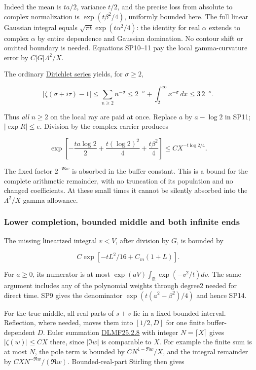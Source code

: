 Indeed the mean is \(ta/2\), variance \(t/2\), and the precise loss from absolute to complex normalization is \(\exp(t \beta^{2}/4)\), uniformly bounded here. The full linear Gaussian integral equals \(\sqrt{\pi t}\exp(t \alpha^{2}/4)\): the identity for real \(\alpha\) extends to complex \(\alpha\) by entire dependence and Gaussian domination. No contour shift or omitted boundary is needed. Equations SP10--11 pay the local gamma-curvature error by \(C |G| \Lambda^{2}/X\).

The ordinary \href{https://dlmf.nist.gov/25.2.E1}{Dirichlet series} yields, for \(\sigma\ge 2\),

\[
|\zeta(\sigma+i\tau)-1|\le\sum_{n\ge2}n^{-\sigma}
 \le 2^{-\sigma}+\int_2^\infty x^{-\sigma}\,dx
 \le3\,2^{-\sigma}.
\tag{SP12}\label{eq:ansatz-sp12}
\]

Thus \emph{all} \(n\ge 2\) on the local ray are paid at once. Replace \(a\) by \(a-\log2\) in SP11; \(|\exp R|\le e\). Division by the complex carrier produces

\[
\exp\left[-\frac{ta\log2}{2}
 +\frac{t(\log2)^2}{4}+\frac{t\beta^2}{4}\right]
 \le C X^{-t\log2/4}.
\tag{SP13}\label{eq:ansatz-sp13}
\]

The fixed factor \(2^{-\Re w}\) is absorbed in the buffer constant. This is a bound for the complete arithmetic remainder, with no truncation of its population and no changed coefficients. At these small times it cannot be silently absorbed into the \(\Lambda^{2}/X\) gamma allowance.

\subsubsection{Lower completion, bounded middle and both infinite ends}
\label{subsec:sp-4}

The missing linearized integral \(v<V\), after division by \(G\), is bounded by

\[
C\exp[-tL^2/16+C_m(1+L)].
\tag{SP14}\label{eq:ansatz-sp14}
\]

For \(a\ge 0\), its numerator is at most \(\exp(aV) \int_{\mathbb R} \exp(-v^{2}/t)dv\). The same argument includes any of the polynomial weights through degree2 needed for direct time. SP9 gives the denominator \(\exp(t(a^{2}-\beta^{2})/4)\) and hence SP14.

For the true middle, all real parts of \(s+v\) lie in a fixed bounded interval. Reflection, where needed, moves them into \([1/2,D]\) for one finite buffer-dependent \(D\). Euler summation \href{https://dlmf.nist.gov/25.2.E8}{DLMF25.2.8} with integer \(N=\lceil X\rceil\) gives \(|\zeta(w)|\le C X\) there, since \(|\Im w|\) is comparable to \(X\). For example the finite sum is at most \(N\), the pole term is bounded by \(C N^{1-\Re w}/X\), and the integral remainder by \(C X N^{-\Re w}/(\Re w)\). Bounded-real-part Stirling then gives

